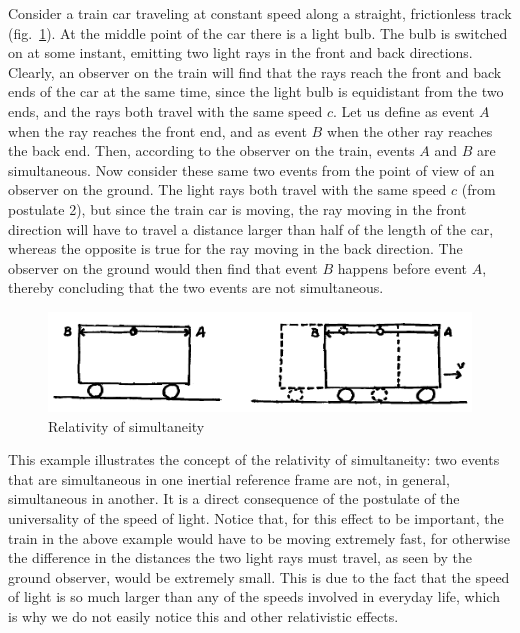 \documentclass[11pt, a4paper,oneside,openright]{book}
\numberwithin{equation}{section}
\begin{document}
Consider a train car traveling at constant speed along a straight, frictionless track (fig.\ \ref{fig:lec2_1}). At the middle point of the car there is a light bulb. The bulb is switched on at some instant, emitting two light rays in the front and back directions. Clearly, an observer on the train will find that the rays reach the front and back ends of the car at the same time, since the light bulb is equidistant from the two ends, and the rays both travel with the same speed $c$. Let us define as event $A$ when the ray reaches the front end, and as event $B$ when the other ray reaches the back end. Then, according to the observer on the train, events $A$ and $B$ are simultaneous. Now consider these same two events from the point of view of an observer on the ground. The light rays both travel with the same speed $c$ (from postulate 2), but since the train car is moving, the ray moving in the front direction will have to travel a distance larger than half of the length of the car, whereas the opposite is 
true for the ray moving in the back direction. The observer on the ground would then find that event $B$ happens before event $A$, thereby concluding that the two events are not simultaneous.
\begin{figure}[ht]
\begin{center}
\includegraphics[scale=0.5]{Draw/lec2_1.png}
\end{center}
\caption{Relativity of simultaneity}
\label{fig:lec2_1}
\end{figure}

This example illustrates the concept of the relativity of simultaneity: two events that are simultaneous in one inertial reference frame are not, in general, simultaneous in another. It is a direct consequence of the postulate of the universality of the speed of light. Notice that, for this effect to be important, the train in the above example would have to be moving extremely fast, for otherwise the difference in the distances the two light rays must travel, as seen by the ground observer, would be extremely small. This is due to the fact that the speed of light is so much larger than any of the speeds involved in everyday life, which is why we do not easily notice this and other relativistic effects.
\end{document}

